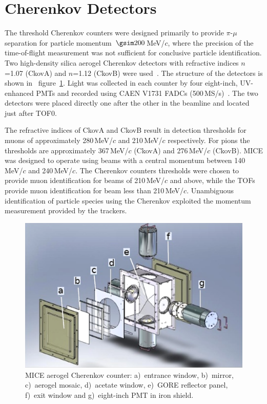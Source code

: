 \graphicspath{{03-Ckov/Figures/}}

\section{Cherenkov Detectors}
\label{Sect:Ckov}

The threshold Cherenkov counters were designed primarily to provide
$\pi$-$\mu$ separation for particle momentum~$\gsim 200$\,MeV/$c$, where
the precision of the time-of-flight measurement was not sufficient for
conclusive particle identification.
Two high-density silica aerogel Cherenkov detectors with refractive
indices $n$=1.07 (CkovA) and $n$=1.12 (CkovB) were
used~\cite{Cremaldi:2009zj}.
The structure of the detectors is shown in ~figure~\ref{fig:ckov1}.
Light was collected in each counter by four eight-inch, UV-enhanced
PMTs and recorded using CAEN V1731 FADCs (500\,MS/s)~\cite{NOTE473}.
The two detectors were placed directly one after the other in the
beamline and located just after TOF0.

The refractive indices of CkovA and CkovB result in detection
thresholds for muons of approximately 280\,MeV/$c$ and 210\,MeV/$c$ respectively.
For pions the thresholds are approximately 367\,MeV/$c$ (CkovA) and
276\,MeV/$c$ (CkovB).
MICE was designed to operate using beams with a central momentum
between 140\,MeV/$c$ and 240\,MeV/$c$.
The Cherenkov counters thresholds were chosen to provide muon identification for beams of 210\,MeV/$c$ and above, while the TOFs provide muon identification for beam less  than 210\,MeV/$c$.
Unambiguous identification of particle species using the Cherenkov
exploited the momentum measurement provided by the trackers. \\
\begin{figure}
  \begin{center}
    \includegraphics[width=0.6\columnwidth]{./03-Ckov/Figures/Ckov_fix.png}
  \end{center}
  \caption{
    MICE aerogel Cherenkov counter: a)~entrance window,
    b)~mirror, c)~aerogel mosaic, d)~acetate window, e)~GORE reflector
    panel, f)~exit window and g)~eight-inch PMT in iron shield.
  } 
  \label{fig:ckov1}
\end{figure}

